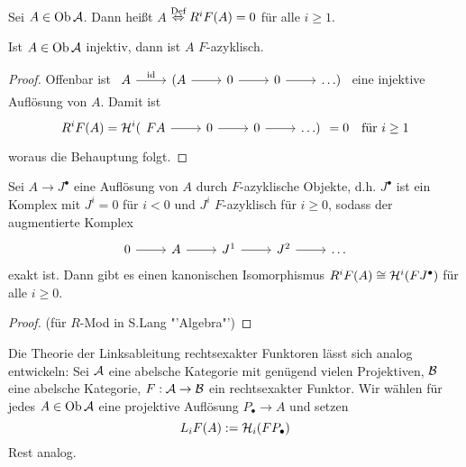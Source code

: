 \begin{df}\label{8.4}
	Sei $A\in \text{Ob}\,\mathcal{A}$. Dann heißt $A$  $\overset{\text{Def}}{\Leftrightarrow} R^iF(A) = 0$ für alle $i \geq 1$.
\end{df}
\begin{bem}\label{8.5}
	Ist $A\in \text{Ob}\,\mathcal{A}$ injektiv, dann ist $A$ $F$-azyklisch.
\end{bem}
\begin{proof}
	Offenbar ist $\begin{tikzcd}
	A \arrow{r}{\id} & (A \arrow{r} & 0 \arrow{r} & 0 \arrow{r} & \ldots)
	\end{tikzcd}$ eine injektive Auflösung von $A$. Damit ist 
	$$R^iF(A) = \HH^i(\begin{tikzcd}
	FA \arrow{r} & 0 \arrow{r} & 0\arrow{r} & \ldots)
	\end{tikzcd} =0 \quad \text{für }i\geq 1$$
	woraus die Behauptung folgt.
\end{proof}
\begin{sa}\label{8.6}
	Sei $A\to J^\bullet$ eine Auflösung von $A$ durch $F$-azyklische Objekte, d.h. $J^\bullet$ ist ein Komplex mit $J^i=0$ für $i<0$ und $J^i$ $F$-azyklisch für $i\geq 0$, sodass der augmentierte Komplex $$\begin{tikzcd}
	0 \arrow{r} & A \arrow{r} & J^1 \arrow{r} & J^2 \arrow{r} & \ldots
	\end{tikzcd}$$
	exakt ist. Dann gibt es einen kanonischen Isomorphismus $R^iF(A) \cong \mathcal{H}^i(FJ^\bullet)$ für alle $i\geq 0$.
\end{sa}
\begin{proof}
	(für $R$-Mod in S.Lang "'Algebra"')
\end{proof}
\begin{anm}
	Die Theorie der Linksableitung rechtsexakter Funktoren lässt sich analog entwickeln: Sei $\mathcal{A}$ eine abelsche Kategorie mit genügend vielen Projektiven, $\mathcal{B}$ eine abelsche Kategorie, $F:\mathcal{A}\to \mathcal{B}$ ein rechtsexakter Funktor. Wir wählen für jedes $A\in \text{Ob}\,\mathcal{A}$ eine projektive Auflösung $P_\bullet \to A$ und setzen 
	$$L_iF(A):= \mathcal{H}_i(FP_\bullet)$$
	Rest analog.
\end{anm}
\newpage
